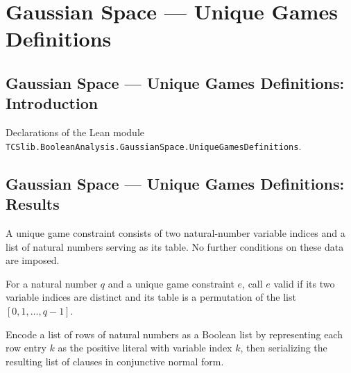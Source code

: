 \section{Gaussian Space --- Unique Games Definitions}
\subsection*{Gaussian Space --- Unique Games Definitions: Introduction}

Declarations of the Lean module \texttt{TCSlib.BooleanAnalysis.GaussianSpace.UniqueGamesDefinitions}.

\subsection*{Gaussian Space --- Unique Games Definitions: Results}

\begin{definition}
\label{BooleanAnalysis.GaussianSpace.UniqueGames.UniqueGameConstraint}
\leanok
A unique game constraint consists of two natural-number variable indices and a list of
natural numbers serving as its table. No further conditions on these data are imposed.
\end{definition}

\begin{definition}
\label{BooleanAnalysis.GaussianSpace.UniqueGames.UniqueGameConstraint.Valid}
\leanok
{}
For a natural number $q$ and a unique game constraint $e$, call $e$ valid if its two
variable indices are distinct and its table is a permutation of the list
$[0,1,\ldots,q-1]$.
\end{definition}

\begin{definition}
\label{BooleanAnalysis.GaussianSpace.UniqueGames.encodeNatRows}
\leanok
{}
Encode a list of rows of natural numbers as a Boolean list by representing each row
entry $k$ as the positive literal with variable index $k$, then serializing the
resulting list of clauses in conjunctive normal form.
\end{definition}

